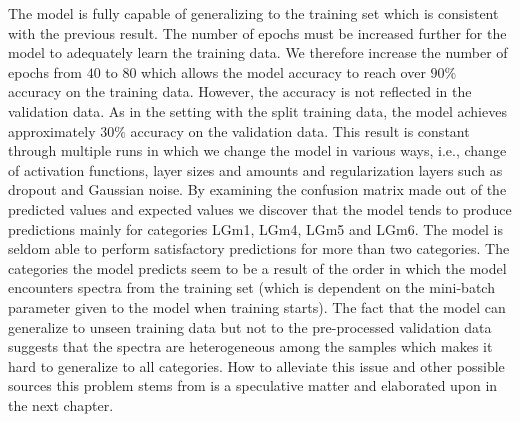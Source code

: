 The model is fully capable of generalizing to the training set which is consistent with the previous result. The number of epochs must be increased further for the model to adequately learn the training data. We therefore increase the number of epochs from $40$ to $80$ which allows the model accuracy to reach over $90\%$ accuracy on the training data. However, the accuracy is not reflected in the validation data. As in the setting with the split training data, the model achieves approximately $30\%$ accuracy on the validation data. This result is constant through multiple runs in which we change the model in various ways, i.e., change of activation functions, layer sizes and amounts and regularization layers such as dropout and Gaussian noise. By examining the confusion matrix made out of the predicted values and expected values we discover that the model tends to produce predictions mainly for categories LGm1, LGm4, LGm5 and LGm6. The model is seldom able to perform satisfactory predictions for more than two categories. The categories the model predicts seem to be a result of the order in which the model encounters spectra from the training set (which is dependent on the mini-batch parameter given to the model when training starts). The fact that the model can generalize to unseen training data but not to the pre-processed validation data suggests that the spectra are heterogeneous among the samples which makes it hard to generalize to all categories. How to alleviate this issue and other possible sources this problem stems from is a speculative matter and elaborated upon in the next chapter.

